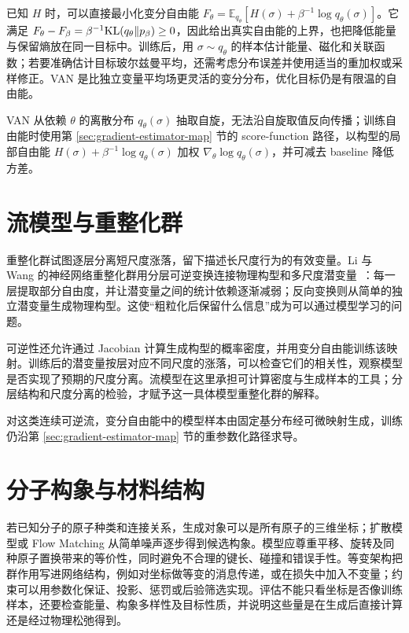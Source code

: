 已知 \(H\) 时，可以直接最小化变分自由能 \(F_\theta=\mathbb E_{q_\theta}[H(\sigma)+\beta^{-1}\log q_\theta(\sigma)]\)。它满足 \(F_\theta-F_\beta=\beta^{-1}\mathrm{KL}(q_\theta\Vert p_\beta)\geq 0\)，因此给出真实自由能的上界，也把降低能量与保留熵放在同一目标中。训练后，用 \(\sigma\sim q_\theta\) 的样本估计能量、磁化和关联函数；若要准确估计目标玻尔兹曼平均，还需考虑分布误差并使用适当的重加权或采样修正。VAN 是比独立变量平均场更灵活的变分分布，优化目标仍是有限温的自由能。

VAN 从依赖 \(\theta\) 的离散分布 \(q_\theta(\sigma)\) 抽取自旋，无法沿自旋取值反向传播；训练自由能时使用第 \ref{sec:gradient-estimator-map} 节的 score-function 路径，以构型的局部自由能 \(H(\sigma)+\beta^{-1}\log q_\theta(\sigma)\) 加权 \(\nabla_\theta\log q_\theta(\sigma)\)，并可减去 baseline 降低方差。

\section{流模型与重整化群}

重整化群试图逐层分离短尺度涨落，留下描述长尺度行为的有效变量。Li 与 Wang 的神经网络重整化群用分层可逆变换连接物理构型和多尺度潜变量~\cite{li2018neuralrg}：每一层提取部分自由度，并让潜变量之间的统计依赖逐渐减弱；反向变换则从简单的独立潜变量生成物理构型。这使“粗粒化后保留什么信息”成为可以通过模型学习的问题。

可逆性还允许通过 Jacobian 计算生成构型的概率密度，并用变分自由能训练该映射。训练后的潜变量按层对应不同尺度的涨落，可以检查它们的相关性，观察模型是否实现了预期的尺度分离。流模型在这里承担可计算密度与生成样本的工具；分层结构和尺度分离的检验，才赋予这一具体模型重整化群的解释。

对这类连续可逆流，变分自由能中的模型样本由固定基分布经可微映射生成，训练仍沿第 \ref{sec:gradient-estimator-map} 节的重参数化路径求导。

\section{分子构象与材料结构}

若已知分子的原子种类和连接关系，生成对象可以是所有原子的三维坐标；扩散模型或 Flow Matching 从简单噪声逐步得到候选构象。模型应尊重平移、旋转及同种原子置换带来的等价性，同时避免不合理的键长、碰撞和错误手性。等变架构把群作用写进网络结构，例如对坐标做等变的消息传递，或在损失中加入不变量；约束可以用参数化保证、投影、惩罚或后验筛选实现。评估不能只看坐标是否像训练样本，还要检查能量、构象多样性及目标性质，并说明这些量是在生成后直接计算还是经过物理松弛得到。

